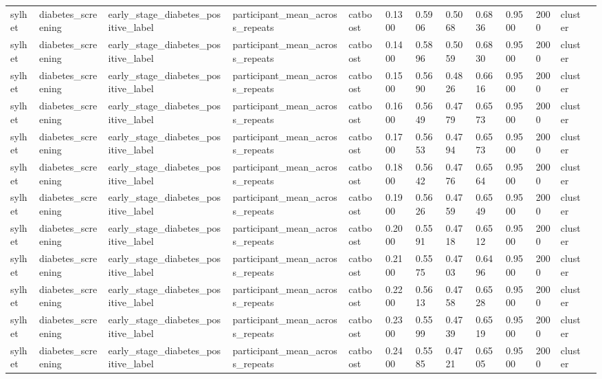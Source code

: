 \begin{tabular}{lllllllllllll}
sylhet & diabetes\_screening & early\_stage\_diabetes\_positive\_label & participant\_mean\_across\_repeats & catboost & 0.1300 & 0.5906 & 0.5068 & 0.6836 & 0.9500 & 2000 & cluster &  \\
sylhet & diabetes\_screening & early\_stage\_diabetes\_positive\_label & participant\_mean\_across\_repeats & catboost & 0.1400 & 0.5896 & 0.5059 & 0.6830 & 0.9500 & 2000 & cluster &  \\
sylhet & diabetes\_screening & early\_stage\_diabetes\_positive\_label & participant\_mean\_across\_repeats & catboost & 0.1500 & 0.5690 & 0.4826 & 0.6616 & 0.9500 & 2000 & cluster &  \\
sylhet & diabetes\_screening & early\_stage\_diabetes\_positive\_label & participant\_mean\_across\_repeats & catboost & 0.1600 & 0.5649 & 0.4779 & 0.6573 & 0.9500 & 2000 & cluster &  \\
sylhet & diabetes\_screening & early\_stage\_diabetes\_positive\_label & participant\_mean\_across\_repeats & catboost & 0.1700 & 0.5653 & 0.4794 & 0.6573 & 0.9500 & 2000 & cluster &  \\
sylhet & diabetes\_screening & early\_stage\_diabetes\_positive\_label & participant\_mean\_across\_repeats & catboost & 0.1800 & 0.5642 & 0.4776 & 0.6564 & 0.9500 & 2000 & cluster &  \\
sylhet & diabetes\_screening & early\_stage\_diabetes\_positive\_label & participant\_mean\_across\_repeats & catboost & 0.1900 & 0.5626 & 0.4759 & 0.6549 & 0.9500 & 2000 & cluster &  \\
sylhet & diabetes\_screening & early\_stage\_diabetes\_positive\_label & participant\_mean\_across\_repeats & catboost & 0.2000 & 0.5591 & 0.4718 & 0.6512 & 0.9500 & 2000 & cluster &  \\
sylhet & diabetes\_screening & early\_stage\_diabetes\_positive\_label & participant\_mean\_across\_repeats & catboost & 0.2100 & 0.5575 & 0.4703 & 0.6496 & 0.9500 & 2000 & cluster &  \\
sylhet & diabetes\_screening & early\_stage\_diabetes\_positive\_label & participant\_mean\_across\_repeats & catboost & 0.2200 & 0.5613 & 0.4758 & 0.6528 & 0.9500 & 2000 & cluster &  \\
sylhet & diabetes\_screening & early\_stage\_diabetes\_positive\_label & participant\_mean\_across\_repeats & catboost & 0.2300 & 0.5599 & 0.4739 & 0.6519 & 0.9500 & 2000 & cluster &  \\
sylhet & diabetes\_screening & early\_stage\_diabetes\_positive\_label & participant\_mean\_across\_repeats & catboost & 0.2400 & 0.5585 & 0.4721 & 0.6505 & 0.9500 & 2000 & cluster &  \\

\end{tabular}
